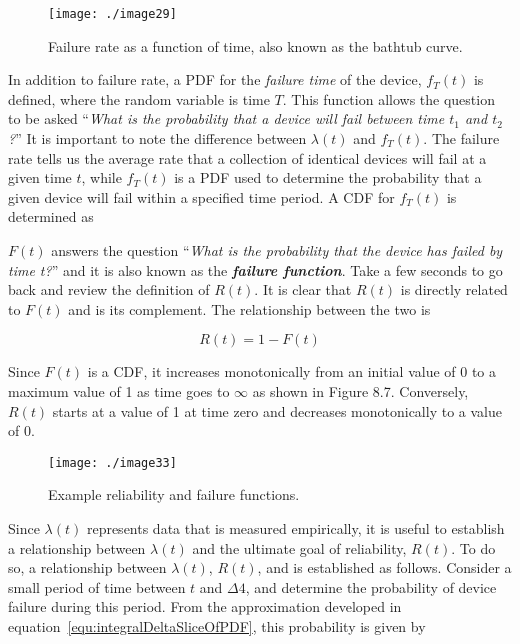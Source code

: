 {\begin{figure}
\texttt{[image: ./image29]}
\caption{Failure rate as a function of time, also known as
the bathtub curve.}
\label{figure:bathtubFunction}
\end{figure}

In addition to failure rate, a PDF for the \emph{failure time} of the
device, $f_T(t)$ is defined, where the
random variable is time $T$. This function allows the question to
be asked ``\emph{What is the probability that a device will fail between
time $t_1$ and $t_2$?}'' It is important to
note the difference between $\lambda(t)$ and
$f_T(t)$. The failure rate tells us the
average rate that a collection of identical devices will fail at a given
time $t$, while $f_T(t)$ is a PDF
used to determine the probability that a given device will fail within a
specified time period. A CDF for $f_T(t)$
is determined as



$F(t)$ answers the question ``\emph{What is the probability that
the device has failed by time t?}'' and it is also known as the
\emph{\textbf{failure function}}. Take a few seconds to go back and
review the definition of $R(t)$. It is clear that $R(t)$ is
directly related to $F(t)$ and is its complement. The relationship
between the two is

\begin{equation}
\label{equ:integralDeltaSliceOfPDF}
R(t) = 1 - F(t)
\end{equation}


Since $F(t)$ is a CDF, it increases monotonically from an initial
value of 0 to a maximum value of 1 as time goes to $\infty$ as shown in Figure
8.7. Conversely, $R(t)$ starts at a value of 1 at time zero and
decreases monotonically to a value of 0.


\begin{figure}
\texttt{[image: ./image33]}
\caption{Example reliability and failure functions.}
\label{figure:reliabilityAndFailure}
\end{figure}

Since $\lambda(t)$ represents data that is measured empirically, it is
useful to establish a relationship between $\lambda(t)$ and the ultimate
goal of reliability, $R(t)$. To do so, a relationship between
$\lambda(t)$, $R(t)$, and  is
established as follows. Consider a small period of time between $t$
and $\Delta 4$, and determine the
probability of device failure during this period. From the approximation
developed in 
equation~\ref{equ:integralDeltaSliceOfPDF}, this probability is given by

}
